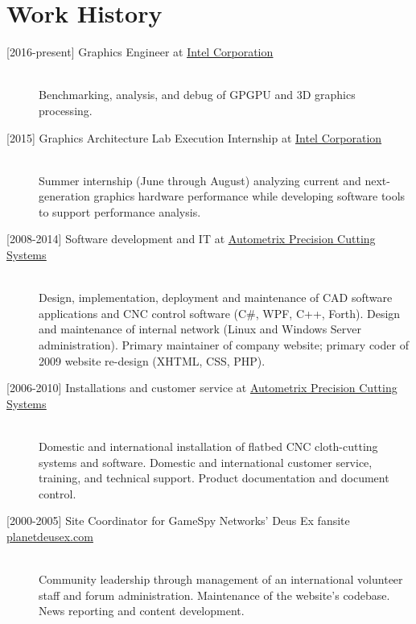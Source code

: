 \documentclass{article}
\begin{document}
	\section*{Work History}
	\begin{description}
		\item[{[}2016-present{]} Graphics Engineer at \href{http://www.intel.com/}{\ul{Intel Corporation}}] \hfill \\
		Benchmarking, analysis, and debug of GPGPU and 3D graphics processing.
		\item[{[}2015{]} Graphics Architecture Lab Execution Internship at \href{http://www.intel.com/}{\ul{Intel Corporation}}] \hfill \\
		Summer internship (June through August) analyzing current and next-generation graphics hardware performance while developing software tools to support performance analysis.
		\item[{[}2008-2014{]} Software development and IT at \href{http://www.autometrix.com/}{\ul{Autometrix Precision Cutting Systems}}] \hfill \\
		Design, implementation, deployment and maintenance of CAD software applications and CNC control software (C\#, WPF, C++, Forth). Design and maintenance of internal network (Linux and Windows Server administration). Primary maintainer of company website; primary coder of 2009 website re-design (XHTML, CSS, PHP).
		\item[{[}2006-2010{]} Installations and customer service at \href{http://www.autometrix.com/}{\ul{Autometrix Precision Cutting Systems}}] \hfill \\
		Domestic and international installation of flatbed CNC cloth-cutting systems and software. Domestic and international customer service, training, and technical support. Product documentation and document control.
		\item[{[}2000-2005{]} Site Coordinator for GameSpy Networks' Deus Ex fansite \href{http://planetdeusex.com}{\ul{planetdeusex.com}}] \hfill \\
		Community leadership through management of an international volunteer staff and forum administration. Maintenance of the website's codebase. News reporting and content development.
	\end{description}
\end{document}
